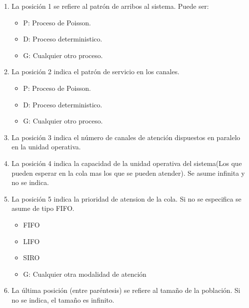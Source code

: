\documentclass{article}
\begin{document}
\begin{enumerate}
    \item La posición 1 se refiere al patrón de arribos al sistema. Puede ser:
    \begin{itemize}
        \item P: Proceso de Poisson.
        \item D: Proceso deterministico.
        \item G: Cualquier otro proceso.
    \end{itemize}
    \item La posición 2 indica el patrón de servicio en los canales.
    \begin{itemize}
        \item P: Proceso de Poisson.
        \item D: Proceso deterministico.
        \item G: Cualquier otro proceso.
    \end{itemize}
    \item La posición 3 indica el número de canales de atención dispuestos en paralelo en la unidad operativa.
    \item La posición 4 indica la capacidad de la unidad operativa del sistema(Los que pueden esperar en la cola mas los que se pueden atender). Se asume infinita y no se indica.
    \item La posición 5 indica la prioridad de atension de la cola.  Si no se especifica se asume de tipo FIFO.
    \begin{itemize}
        \item FIFO
        \item LIFO
        \item SIRO
        \item G: Cualquier otra modalidad de atención
    \end{itemize}
    \item La última posición (entre paréntesis) se refiere al tamaño de la población. Si no se indica, el tamaño es infinito.
\end{enumerate}



\newpage
\end{document}
